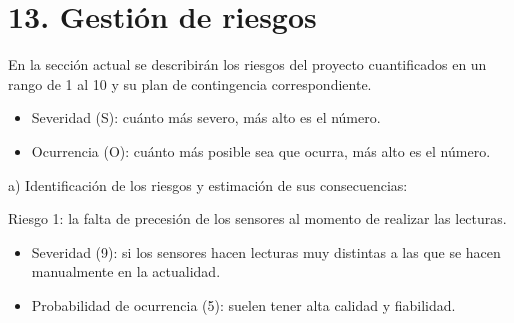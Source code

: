 \documentclass[
11pt, %
]{charter}
\begin{document}

\section{13. Gestión de riesgos}
\label{sec:riesgos}

En la sección actual se describirán los riesgos del proyecto cuantificados en un rango de 1 al 10 y su plan de contingencia correspondiente.

\begin{itemize}
	\item Severidad (S): cuánto más severo, más alto es el número.\\

	\item Ocurrencia (O): cuánto más posible sea  que ocurra, más alto es el número.\\
\end{itemize}   

a) Identificación de los riesgos y estimación de sus consecuencias:
 
Riesgo 1: la falta de precesión de los sensores al momento de realizar las lecturas.
\begin{itemize}
	\item Severidad (9): si los sensores hacen lecturas muy distintas a las que se hacen manualmente en la actualidad.\\
	\item Probabilidad de ocurrencia (5): suelen tener alta calidad y fiabilidad.\\
\end{itemize}   
\end{document}
